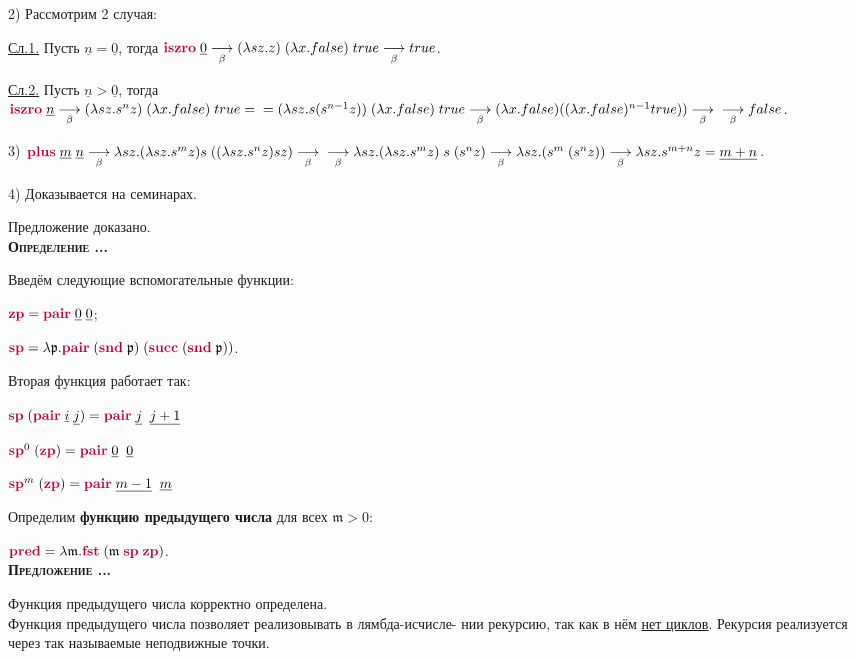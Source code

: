 \documentclass[18pt, a4paper]{extarticle}
\newcounter{par}
\newcounter{spar}
\newcounter{zap}
\newcommand{\opr}{\textbf{\textsc{Определение \thepar.\if\thespar1\thespar.\fi\thezap.\;}}\stepcounter{zap}}
\newcommand{\predl}{\textbf{\textsc{Предложение \thepar.\if\thespar1\thespar.\fi\thezap.\;}}\stepcounter{zap}}
\newcommand{\msM}{\mathfrak{m}}
\newcommand{\msP}{\mathfrak{p}}
\newcommand{\mzero}{\mathfrak{0}}
\newcommand{\lm}{\lambda}
\newcommand{\redb}{\underset{\beta}{\longrightarrow}}
\newcommand{\lfunction}[1]{\textcolor{purple}{\textbf{#1}}}
\newcommand{\churchnum}[1]{{\underline{#1}}}
\begin{document}
2) Рассмотрим 2 случая:

\underline{Сл.1.} Пусть $\churchnum{n} = \churchnum{0}$, тогда $\lfunction{iszro}\;\churchnum{0}\redb (\lm sz.z)\;(\lm x.false)\;true\redb true$.

\underline{Сл.2.} Пусть $\churchnum{n}>\churchnum{0}$, тогда $\lfunction{iszro}\;\churchnum{n}\redb (\lm sz.s^nz)\;(\lm x.false)\;true=\newline=(\lm sz.s(s^{n-1}z))\;(\lm x.false)\;true\redb (\lm x.false)((\lm x.false)
^{n-1}true))\redb\newline\redb false$.

3) $\lfunction{plus}\;\churchnum{m}\;\churchnum{n}\redb\lm sz.(\lm sz.s^mz)s\;((\lm sz.s^nz)sz)\redb\newline\redb\lm sz.(\lm sz.s^mz)\;s\;(s^nz)\redb\lm sz.(s^m\;(s^nz))\redb\lm sz.s^{m + n}z=\churchnum{m + n}$.

4) Доказывается на семинарах.

Предложение доказано.\\

\opr

Введём следующие вспомогательные функции:

$\lfunction{zp}=\lfunction{pair}\;\churchnum{0}\;\churchnum{0}$;

$\lfunction{sp}=\lm\msP .\lfunction{pair}\;(\lfunction{snd}\;\msP)\;(\lfunction{succ}\;(\lfunction{snd}\;\msP))$.

Вторая функция работает так:

$\lfunction{sp}\;(\lfunction{pair}\;\churchnum{i}\;\churchnum{j}) = \lfunction{pair}\;\churchnum{j}\;\;\churchnum{j + 1}$

$\lfunction{sp}^0\;(\lfunction{zp})=\lfunction{pair}\;\churchnum{0}\;\;\churchnum{0}$

$\lfunction{sp}^m\;(\lfunction{zp})=\lfunction{pair}\;\churchnum{m - 1}\;\;\churchnum{m}$

Определим \textbf{функцию предыдущего числа} для всех $\msM >\mzero$:

$\lfunction{pred}=\lm \msM .\lfunction{fst}\;(\msM\;\lfunction{sp}\;\lfunction{zp})$.\\

\predl

Функция предыдущего числа корректно определена.\\

Функция предыдущего числа позволяет реализовывать в лямбда-исчисле- нии рекурсию, так как в нём \underline{нет циклов}. Рекурсия реализуется через так называемые неподвижные точки.\\
\end{document}
